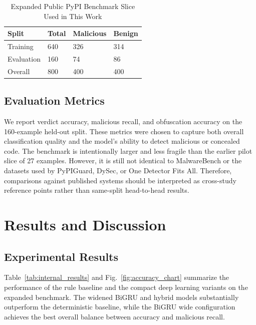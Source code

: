 \documentclass[conference]{IEEEtran}
\begin{document}
\begin{table}[htbp]
\caption{Expanded Public PyPI Benchmark Slice Used in This Work}
\label{tab:dataset}
\centering
\renewcommand{\arraystretch}{1.2}
\begin{tabular}{p{2.2cm}p{1.2cm}p{1.2cm}p{1.45cm}}
\toprule
\textbf{Split} & \textbf{Total} & \textbf{Malicious} & \textbf{Benign} \\
\midrule
Training & 640 & 326 & 314 \\
Evaluation & 160 & 74 & 86 \\
Overall & 800 & 400 & 400 \\
\bottomrule
\end{tabular}
\end{table}

\subsection{Evaluation Metrics}
We report verdict accuracy, malicious recall, and obfuscation accuracy on the 160-example held-out split. These metrics were chosen to capture both overall classification quality and the model's ability to detect malicious or concealed code. The benchmark is intentionally larger and less fragile than the earlier pilot slice of 27 examples. However, it is still not identical to MalwareBench or the datasets used by PyPIGuard, DySec, or One Detector Fits All. Therefore, comparisons against published systems should be interpreted as cross-study reference points rather than same-split head-to-head results.

\section{Results and Discussion}
\subsection{Experimental Results}
Table~\ref{tab:internal_results} and Fig.~\ref{fig:accuracy_chart} summarize the performance of the rule baseline and the compact deep learning variants on the expanded benchmark. The widened BiGRU and hybrid models substantially outperform the deterministic baseline, while the BiGRU wide configuration achieves the best overall balance between accuracy and malicious recall.
\end{document}
